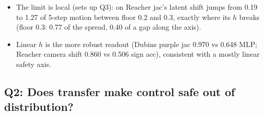 \documentclass{article}
\begin{document}
\begin{itemize}
  \item The limit is local (sets up Q3): on Reacher jac's latent shift jumps from 0.19 to 1.27 of 5-step motion between floor 0.2 and 0.3, exactly where its $h$ breaks (floor 0.3: 0.77 of the spread, 0.40 of a gap along the axis).
  \item Linear $h$ is the more robust readout (Dubins purple jac 0.970 vs 0.648 MLP; Reacher camera shift 0.860 vs 0.506 sign acc), consistent with a mostly linear safety axis.
\end{itemize}

\subsection{Q2: Does transfer make control safe out of distribution?}
\label{sec:cem}
\end{document}

